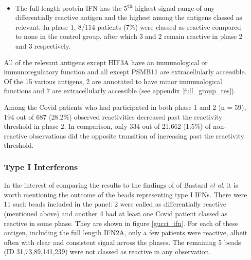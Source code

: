\documentclass{article}
\begin{document}
\begin{itemize}
    \item The full length protein IFN\textomega{} has the 5\textsuperscript{th} highest signal range of any differentially reactive antigen and the highest among the antigens classed as relevant. In phase 1, 8/114 patients (7\%) were classed as reactive compared to none in the control group, after which 3 and 2 remain reactive in phase 2 and 3 respectively.
\end{itemize}

All of the relevant antigens except HIF3A have an immunological or immunoregulatory function and all except PSMB11 are extracellularly accessible. Of the 15 various antigens, 2 are annotated to have minor immunological functions and 7 are extracellularly accessible (see appendix \ref{full_group_res}).

Among the Covid patients who had participated in both phase 1 and 2 (n = 59), 194 out of 687 (28.2\%) observed reactivities decreased past the reactivity threshold in phase 2. In comparison, only 334 out of 21,662 (1.5\%) of non-reactive observations did the opposite transition of increasing past the reactivity threshold.

\subsubsection{Type I Interferons}
In the interest of comparing the results to the findings of of Bastard \textit{et al}, it is worth mentioning the outcome of the beads representing type I IFNs. There were 11 such beads included in the panel: 2 were called as differentially reactive (mentioned above) and another 4 had at least one Covid patient classed as reactive in some phase. They are shown in figure \ref{gucci_ifn}. For each of these antigen, including the full length IFN\textalpha2A, only a few patients were reactive, albeit often with clear and consistent signal across the phases. The remaining 5 beads (ID 31,73,89,141,239) were not classed as reactive in any observation.
\end{document}

